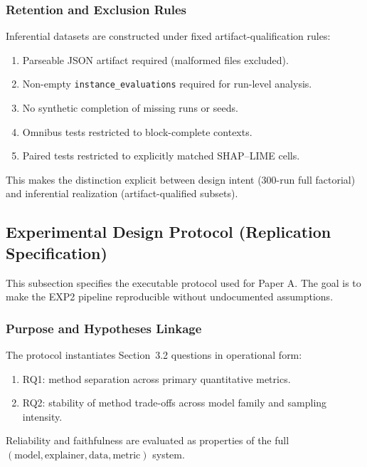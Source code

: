 \documentclass[twoside,11pt]{article}
\begin{document}
\subsubsection{Retention and Exclusion Rules}
Inferential datasets are constructed under fixed artifact-qualification rules:
\begin{enumerate}[leftmargin=*]
    \item Parseable JSON artifact required (malformed files excluded).
    \item Non-empty \texttt{instance\_evaluations} required for run-level analysis.
    \item No synthetic completion of missing runs or seeds.
    \item Omnibus tests restricted to block-complete contexts.
    \item Paired tests restricted to explicitly matched SHAP--LIME cells.
\end{enumerate}
This makes the distinction explicit between design intent (300-run full
factorial) and inferential realization (artifact-qualified subsets).

\subsection{Experimental Design Protocol (Replication Specification)}
This subsection specifies the executable protocol used for Paper A. The goal is
to make the EXP2 pipeline reproducible without undocumented assumptions.

\subsubsection{Purpose and Hypotheses Linkage}
The protocol instantiates Section~3.2 questions in operational form:
\begin{enumerate}[leftmargin=*]
    \item RQ1: method separation across primary quantitative metrics.
    \item RQ2: stability of method trade-offs across model family and sampling intensity.
\end{enumerate}
Reliability and faithfulness are evaluated as properties of the full
$(\text{model},\text{explainer},\text{data},\text{metric})$ system.
\end{document}
